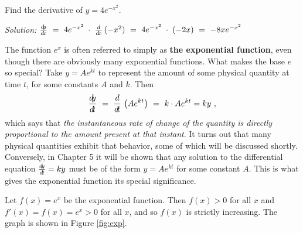 \begin{exmp}\label{exmp:deriv4ex2}
 Find the derivative of $y = 4e^{-x^2}$.\vspace{1mm}
 \par\noindent\emph{Solution:} $\frac{d\negmedspace y}{d\!x} ~=~ 4 e^{-x^2} \;\cdot\; \frac{d}{d\!x}\,(-x^2) ~=~
 4 e^{-x^2} \;\cdot\; (-2x) ~=~ -8x e^{-x^2}$
\end{exmp}
\divider
\newpage
The function $e^x$ is often referred to simply as \textbf{the exponential
function}, even though there are obviously many exponential functions. What
makes the base $e$ so special? Take $y = Ae^{kt}$ to represent the amount of
some physical quantity at time $t$, for some constants $A$ and $k$. Then
\begin{displaymath}
 \frac{d\negmedspace y}{d\!t} ~=~ \frac{d}{d\!t}\,\left(Ae^{kt}\right) ~=~ k \cdot Ae^{kt} = ky ~,
\end{displaymath}
which says that \emph{the instantaneous rate of change of the quantity is
directly proportional to the amount present at that instant}. It turns out that
many physical quantities exhibit that behavior, some of which will be discussed
shortly. Conversely, in Chapter 5 it will be shown that any solution to the
differential equation
$\frac{d\negmedspace y}{d\!t} = ky$ must be of the form $y = Ae^{kt}$ for some constant $A$. This is
what gives the exponential function its special significance.

Let $f(x) = e^x$ be the exponential function. Then $f(x) > 0$ for all $x$ and
$f'(x) = f(x) = e^x > 0$ for all $x$, and so $f(x)$ is
strictly increasing. The graph is shown in Figure \ref{fig:exp}.

